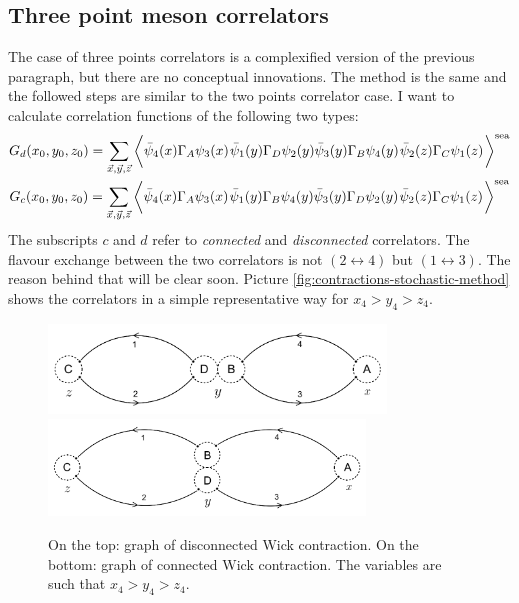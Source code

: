 \documentclass[english, LaM, oneside, noexaminfo]{sapthesis}
\begin{document}
\subsection*{Three point meson correlators}
\noindent
The case of three points correlators is a complexified version of the previous paragraph, but there are no conceptual innovations.
The method is the same and the followed steps are similar to the two points correlator case.
I want to calculate correlation functions of the following two types:
\begin{equation}\label{eq:GdGc-strategy}
    \begin{gathered}
        G_d(x_0,y_0,z_0) = \sum_{\vec x, \vec y, \vec z} \bigg\langle
        \bar\psi_4(x) \Gamma_A \psi_3 (x)\hspace*{.3mm}
        \bar\psi_1(y) \Gamma_D \psi_2 (y) \bar\psi_3(y) \Gamma_B \psi_4 (y)\hspace*{.3mm}
        \bar\psi_2(z) \Gamma_C \psi_1 (z)\hspace*{.3mm}
        \bigg\rangle^{\text{sea}}\\
        G_c(x_0,y_0,z_0) = \sum_{\vec x, \vec y, \vec z} \bigg\langle
        \bar\psi_4(x) \Gamma_A \psi_3 (x)\hspace*{.3mm}
        \bar\psi_1(y) \Gamma_B \psi_4 (y) \bar\psi_3(y) \Gamma_D \psi_2 (y)\hspace*{.3mm}
        \bar\psi_2(z) \Gamma_C \psi_1 (z)\hspace*{.3mm}
        \bigg\rangle^{\text{sea}}\\
    \end{gathered}
\end{equation}
The subscripts $c$ and $d$ refer to {\it connected} and {\it disconnected} correlators.
The flavour exchange between the two correlators is not $(2\leftrightarrow 4)$ but $(1\leftrightarrow 3)$.
The reason behind that will be clear soon.
Picture \ref{fig:contractions-stochastic-method} shows the correlators in a simple representative way for $x_4>y_4>z_4$.
\begin{figure}
    \centering
    \includegraphics[width=0.8\textwidth]{imgs-MSc-thesis/Wick_stochastic_disc.png}
    \includegraphics[width=0.75\textwidth]{imgs-MSc-thesis/Wick_stochastic_conn.png}
    \caption{On the top: graph of disconnected Wick contraction. On the bottom: graph of connected Wick contraction. The variables are such that $x_4 > y_4 > z_4$.}
\end{figure}\label{fig:contractions-stochastic-method}
\end{document}
